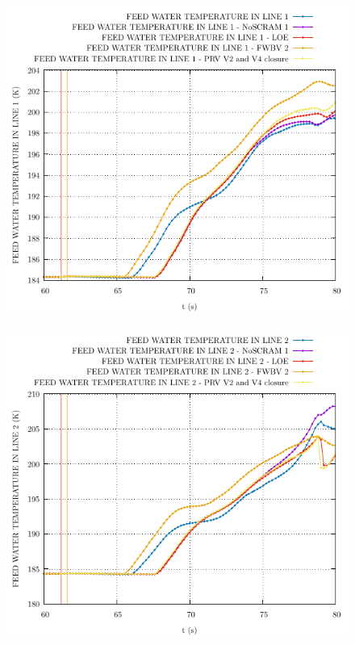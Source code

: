 \documentclass{article}
\begin{document}
\begin{multicols}{2}
\begin{figure}[H]
\centering
\includegraphics[width=\linewidth]{./graphs/FEED WATER TEMPERATURE IN LINE 1.pdf}
\end{figure}
\begin{figure}[H]
\centering
\includegraphics[width=\linewidth]{./graphs/FEED WATER TEMPERATURE IN LINE 2.pdf}
\end{figure}

\end{multicols}
\end{document}
